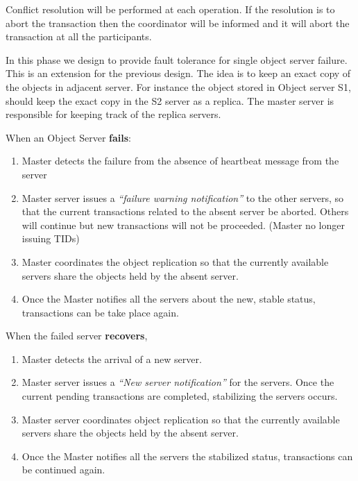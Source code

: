 \documentclass[times, 10pt,twocolumn]{article}
\begin{document}
Conflict resolution will be performed at each operation. If the resolution is to abort the transaction then the coordinator will be informed and it will abort the transaction at all the participants.

\label{subsec:faultol}
In this phase we design to provide fault tolerance for single object server failure. This is an extension for the previous design. The idea is to keep an exact copy of the objects in adjacent server.
For instance the object stored in Object server S1, should keep the exact copy in the S2 server as a replica. The master server is responsible for keeping track of the replica servers.

When an Object Server {\bf fails}:
\begin{enumerate}
\item Master detects the failure from the absence of heartbeat message from the server
\item Master server issues a {\it “failure warning notification”} to the other servers, so that the current transactions related to the absent server be aborted.
Others will continue but new transactions will not be proceeded. (Master no longer issuing TIDs)
\item Master coordinates the object replication so that the currently available servers share the objects held by the absent server.
\item Once the Master notifies all the servers about the new, stable status, transactions can be take place again.
\end{enumerate}

When the failed server {\bf recovers},
\begin{enumerate}
\item Master detects the arrival of a new server.
\item Master server issues a {\it “New server notification”} for the servers. Once the current pending transactions are completed, stabilizing the servers occurs.
\item Master server coordinates object replication so that the currently available servers share the objects held by the absent server.
\item Once the Master notifies all the servers the stabilized status, transactions can be continued again.
\end{enumerate}






\end{document}
